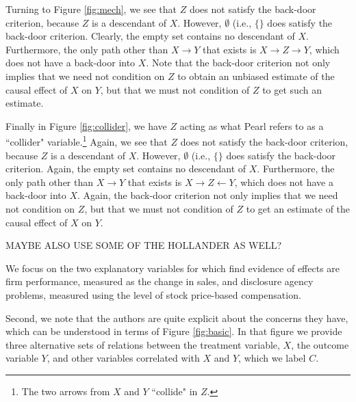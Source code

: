\documentclass[11pt]{amsart}
\begin{document}

Turning to Figure \ref{fig:mech}, we see that $Z$ does not satisfy the back-door criterion, because $Z$ is a descendant of $X$.
However, $\emptyset$ (i.e., $\{\}$ does satisfy the back-door criterion.
Clearly, the empty set contains no descendant of $X$.
Furthermore, the only path other than $X \rightarrow Y$ that exists is $X \rightarrow Z \rightarrow Y$, which does not have a back-door into $X$.
Note that the back-door criterion not only implies that we need not condition on $Z$ to obtain an unbiased estimate of the causal effect of $X$ on $Y$, but that we must not condition of $Z$ to get such an estimate.


Finally in Figure \ref{fig:collider}, we have $Z$ acting as what Pearl refers to as a ``collider" variable.\footnote{
The two arrows from $X$ and $Y$ ``collide" in $Z$.} %
Again, we see that $Z$ does not satisfy the back-door criterion, because $Z$ is a descendant of $X$.
However, $\emptyset$ (i.e., $\{\}$ does satisfy the back-door criterion.
Again, the empty set contains no descendant of $X$.
Furthermore, the only path other than $X \rightarrow Y$ that exists is $X \rightarrow Z \leftarrow Y$, which does not have a back-door into $X$.
Again, the back-door criterion not only implies that we need not condition on $Z$, but that we must not condition of $Z$ to get an estimate of the causal effect of $X$ on $Y$.



MAYBE ALSO USE SOME OF THE HOLLANDER AS WELL?


We focus on the two explanatory variables for which \citet{Hollander:2010jg} find evidence of effects are firm performance, measured as the change in sales, and disclosure agency problems, measured using the level of stock price-based compensation.



Second, we note that the authors are quite explicit about the concerns they have, which can be understood in terms of Figure \ref{fig:basic}.
In that figure we provide three alternative sets of relations between the treatment variable, $X$, the outcome variable $Y$, and other variables correlated with $X$ and $Y$, which we label $C$.
\end{document}
